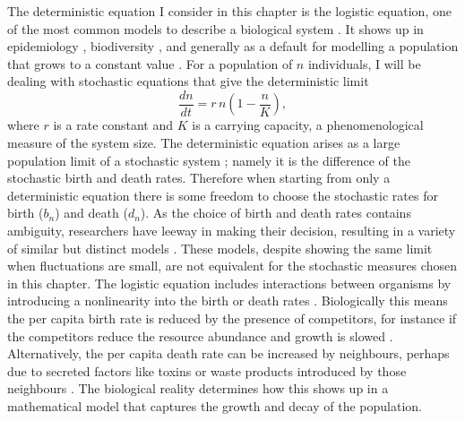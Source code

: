 The deterministic equation I consider in this chapter is the logistic equation, one of the most common models to describe a biological system \cite{Greenhalgh1990,Ovaskainen2010,Assaf2010,Allen2003,Norden1982,Newman2004,Allen2005,Fujita1953,Nasell2001}. 
It shows up in epidemiology \cite{Assaf2009,others?}, biodiversity \cite{Hubbell2001?,others?}, and generally as a default for modelling a population that grows to a constant value \cite{bacteria OD, eg}. %
For a population of $n$ individuals, I will be dealing with stochastic equations that give the deterministic limit
\begin{equation}
\frac{dn}{dt} = r\,n\left(1-\frac{n}{K}\right),
\label{logistic}
\end{equation}
where $r$ is a rate constant and $K$ is a carrying capacity, a phenomenological measure of the system size. 
The deterministic equation arises as a large population limit of a stochastic system \cite{Nisbet1982,Gardiner2004,Rouzine2001}; namely it is the difference of the stochastic birth and death rates. 
Therefore when starting from only a deterministic equation there is some freedom to choose the stochastic rates for birth ($b_n$) and death ($d_n$). 
As the choice of birth and death rates contains ambiguity, researchers have leeway in making their decision, resulting in a variety of similar but distinct models \cite{Greenhalgh1990,Ovaskainen2010,Assaf2010,Allen2003,Norden1982,Newman2004,Allen2005,Fujita1953,Nasell2001}. 
These models, despite showing the same limit when fluctuations are small, are not equivalent for the stochastic measures chosen in this chapter. 
%
The logistic equation includes interactions between organisms by introducing a nonlinearity into the birth or death rates \cite{Greenhalgh1990,Ovaskainen2010,Assaf2010,Allen2003,Norden1982,Newman2004,Allen2005,Fujita1953,Nasell2001}. 
Biologically this means the per capita birth rate is reduced by the presence of competitors, for instance if the competitors reduce the resource abundance and growth is slowed \cite{Nadell2008,Vulic2001}. 
Alternatively, the per capita death rate can be increased by neighbours, perhaps due to secreted factors like toxins or waste products introduced by those neighbours \cite{Greenhalgh1990,VanMelderen2009,Rankin2012}. 
The biological reality determines how this shows up in a mathematical model that captures the growth and decay of the population. 
